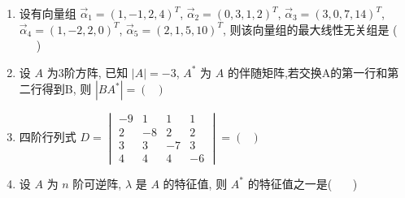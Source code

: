 \begin{enumerate}
	\item 设有向量组 $\vec{\alpha}_1=(1,-1,2,4)^T$, $\vec{\alpha}_2=(0,3,1,2)^T$, $\vec{\alpha}_3=(3,0,7,14)^T$, $\vec{\alpha}_4=(1,-2,2,0)^T$, $\vec{\alpha}_5=(2,1,5,10)^T$, 则该向量组的最大线性无关组是 ( \ \ \ )
	\vspace{0.5em}
	
	\item 设 $A$ 为3阶方阵, 已知 $|A|=-3$, $A^*$ 为 $A$ 的伴随矩阵,若交换A的第一行和第二行得到B, 则 $|BA^*| = ( \ \ \ )$
	\vspace{0.5em}
	
	\item 四阶行列式 $D = \begin{vmatrix} -9 & 1 & 1 & 1 \\ 2 & -8 & 2 & 2 \\ 3 & 3 & -7 & 3 \\ 4 & 4 & 4 & -6 \end{vmatrix} = ( \ \ \ )$
	\vspace{0.5em}
	
	
	\item 设 $A$ 为 $n$ 阶可逆阵, $\lambda$ 是 $A$ 的特征值, 则 $A^*$ 的特征值之一是( \ \ \ )
	\vspace{0.5em}
	

\end{enumerate}
